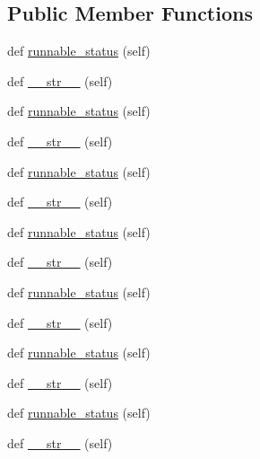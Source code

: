 \subsection*{Public Member Functions}
\begin{DoxyCompactItemize}
\item 
def \hyperlink{classwaflib_1_1extras_1_1doxygen_1_1tar_ab00fcc1c9916ad5302e0483869c00014}{runnable\+\_\+status} (self)
\item 
def \hyperlink{classwaflib_1_1extras_1_1doxygen_1_1tar_ad6afde29277bb81c32d8bb60b1409240}{\+\_\+\+\_\+str\+\_\+\+\_\+} (self)
\item 
def \hyperlink{classwaflib_1_1extras_1_1doxygen_1_1tar_ab00fcc1c9916ad5302e0483869c00014}{runnable\+\_\+status} (self)
\item 
def \hyperlink{classwaflib_1_1extras_1_1doxygen_1_1tar_ad6afde29277bb81c32d8bb60b1409240}{\+\_\+\+\_\+str\+\_\+\+\_\+} (self)
\item 
def \hyperlink{classwaflib_1_1extras_1_1doxygen_1_1tar_ab00fcc1c9916ad5302e0483869c00014}{runnable\+\_\+status} (self)
\item 
def \hyperlink{classwaflib_1_1extras_1_1doxygen_1_1tar_ad6afde29277bb81c32d8bb60b1409240}{\+\_\+\+\_\+str\+\_\+\+\_\+} (self)
\item 
def \hyperlink{classwaflib_1_1extras_1_1doxygen_1_1tar_ab00fcc1c9916ad5302e0483869c00014}{runnable\+\_\+status} (self)
\item 
def \hyperlink{classwaflib_1_1extras_1_1doxygen_1_1tar_ad6afde29277bb81c32d8bb60b1409240}{\+\_\+\+\_\+str\+\_\+\+\_\+} (self)
\item 
def \hyperlink{classwaflib_1_1extras_1_1doxygen_1_1tar_ab00fcc1c9916ad5302e0483869c00014}{runnable\+\_\+status} (self)
\item 
def \hyperlink{classwaflib_1_1extras_1_1doxygen_1_1tar_ad6afde29277bb81c32d8bb60b1409240}{\+\_\+\+\_\+str\+\_\+\+\_\+} (self)
\item 
def \hyperlink{classwaflib_1_1extras_1_1doxygen_1_1tar_ab00fcc1c9916ad5302e0483869c00014}{runnable\+\_\+status} (self)
\item 
def \hyperlink{classwaflib_1_1extras_1_1doxygen_1_1tar_ad6afde29277bb81c32d8bb60b1409240}{\+\_\+\+\_\+str\+\_\+\+\_\+} (self)
\item 
def \hyperlink{classwaflib_1_1extras_1_1doxygen_1_1tar_ab00fcc1c9916ad5302e0483869c00014}{runnable\+\_\+status} (self)
\item 
def \hyperlink{classwaflib_1_1extras_1_1doxygen_1_1tar_ad6afde29277bb81c32d8bb60b1409240}{\+\_\+\+\_\+str\+\_\+\+\_\+} (self)

\end{DoxyCompactItemize}
